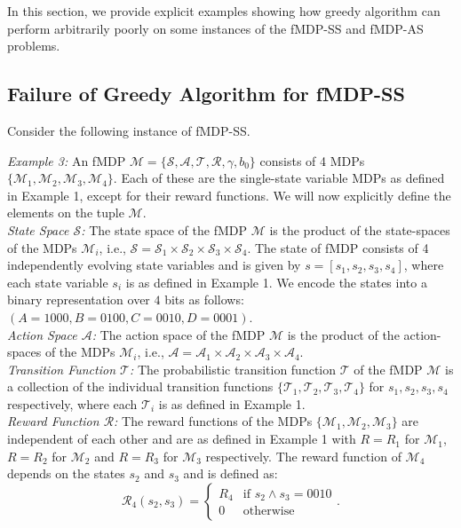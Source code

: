 \documentclass[twocolumn]{autart}    %
\begin{document}
In this section, we provide explicit examples showing how greedy algorithm can perform arbitrarily poorly on some instances of the fMDP-SS and fMDP-AS problems. 
\subsection{Failure of Greedy Algorithm for fMDP-SS}


Consider the following instance of fMDP-SS.

\textit{Example 3:} An fMDP $\mathcal{M}= \{ \mathcal{S}, \mathcal{A}, \mathcal{T}, \mathcal{R}, \gamma, b_0 \}$ consists of 4 MDPs $\{\mathcal{M}_1, \mathcal{M}_2, \mathcal{M}_3, \mathcal{M}_4\}$. Each of these are the single-state variable MDPs as defined in Example 1, except for their reward functions. We will now explicitly define the elements on the tuple $\mathcal{M}$. \\
\textit{State Space $\mathcal{S}$:} The state space of the fMDP $\mathcal{M}$ is the product of the state-spaces of the MDPs $\mathcal{M}_i$, i.e., $\mathcal{S} = \mathcal{S}_1 \times \mathcal{S}_2 \times \mathcal{S}_3 \times \mathcal{S}_4 $. The state of fMDP consists of 4 independently evolving state variables and is given by $s = [s_1,s_2,s_3,s_4]$, where each state variable $s_i$ is as defined in Example 1. We encode the states into a binary representation over $4$ bits as follows: $(A = 1000, B = 0100, C = 0010, D = 0001)$.  \\
\textit{Action Space $\mathcal{A}$:} The action space of the fMDP $\mathcal{M}$ is the product of the action-spaces of the MDPs $\mathcal{M}_i$, i.e.,  $\mathcal{A} = \mathcal{A}_1 \times \mathcal{A}_2 \times \mathcal{A}_3 \times \mathcal{A}_4 $. \\
\textit{Transition Function $\mathcal{T}$:} The probabilistic transition function $\mathcal{T}$ of the fMDP $\mathcal{M}$ is a collection of the individual transition functions $\{ \mathcal{T}_1, \mathcal{T}_2, \mathcal{T}_3, \mathcal{T}_4  \}$ for $s_1,s_2,s_3,s_4$ respectively, where each $\mathcal{T}_i$ is as defined in Example 1.\\
\textit{Reward Function $\mathcal{R}$:} The reward functions of  the MDPs $\{\mathcal{M}_1,\mathcal{M}_2, \mathcal{M}_3 \}$ are independent of each other and are as defined in Example 1 with $R=R_1$ for $\mathcal{M}_1$, $R=R_2$ for $\mathcal{M}_2$ and $R=R_3$ for $\mathcal{M}_3$ respectively. The reward function of $\mathcal{M}_4$ depends on the states $s_2$ and $s_3$ and is defined as:
\begin{equation}
\mathcal{R}_4(s_2,s_3)=
    \begin{cases}
        R_4 & \text{if } s_2 \wedge s_3 = 0010 \\
        0 & \text{otherwise }
    \end{cases}.
\end{equation}
\end{document}
